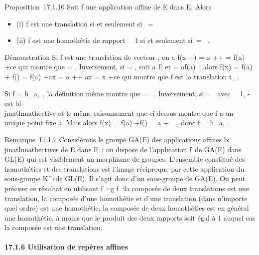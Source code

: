 \documentclass[]{article}
\begin{document}
Proposition~17.1.10 Soit f une application affine de E dans E. Alors

\begin{itemize}
\itemsep1pt\parskip0pt
\item
  (i) f est une translation si et seulement si~\vecf
  = \mathrmId
\item
  (ii) f est une homothétie de rapport \lambda~\neq~1 si
  et seulement si~\vecf =
  \lambda~\mathrmId.
\end{itemize}

Démonstration Si f est une translation de vecteur
\overrightarrow\xi, on a f(x
+\overrightarrow \eta) = x
+\overrightarrow \eta +\overrightarrow
\xi = f(x) +\overrightarrow \eta ce qui montre que
\vecf = \mathrmId. Inversement, si
\vecf = \mathrmId, soit a \in E et
\overrightarrow\xi =\overrightarrow
af(a)~; alors f(x) = f(a) +\vec
f(\overrightarrowax) = f(a)
+\overrightarrow ax = a
+\overrightarrow \xi +\overrightarrow
ax = x +\overrightarrow \xi ce qui montre que f est
la translation t_\overrightarrow\xi.

Si f = h_a,\lambda~, la définition même montre que
\vecf = \lambda~\mathrmId. Inversement,
si \vecf = \lambda~\mathrmId avec
\lambda~\neq~1, \vecf
-\mathrmId est bi\\jmathmathective et le même raisonnement que
ci dessus montre que f a un unique point fixe a. Mais alors f(x) = f(a)
+\vec f(\overrightarrowax) = a + \lambda~
\overrightarrowax, donc f = h_a,\lambda~.

Remarque~17.1.7 Considérons le groupe GA(E) des applications affines
bi\\jmathmathectives de E dans E~; on dispose de l'application
f\mapsto~\vecf de GA(E) dans
GL(E) qui est visiblement un morphisme de groupes. L'ensemble constitué
des homothéties et des translations est l'image réciproque par cette
application du sous-groupe K^∗\mathrmId de
GL(E). Il s'agit donc d'un sous-groupe de GA(E). On peut préciser ce
résultat en utilisant \overrightarrowg \cdot f
=\vec g \cdot\vec f~:la composée de
deux translations est une translation, la composée d'une homothétie et
d'une translation (dans n'importe quel ordre) est une homothétie, la
composée de deux homothéties est en général une homothétie, à moins que
le produit des deux rapports soit égal à 1 auquel cas la composée est
une translation.

\paragraph{17.1.6 Utilisation de repères affines}
\end{document}
